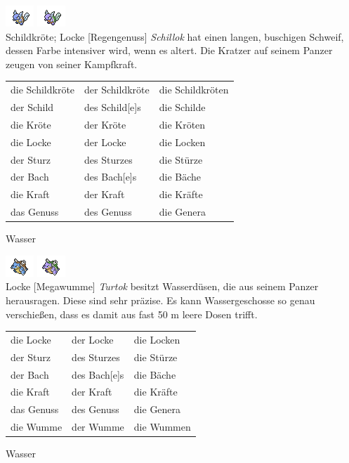 \documentclass[a7paper,10pt,%
,toc
,print
]{kartei}
\begin{document}
\begin{karte}[Sturzbach]{
\includegraphics{../regular/wartortle}
\includegraphics{../shiny/wartortle} \\
Schildkröte; Locke
}[Regengenuss]
\emph{Schillok} hat einen langen, buschigen Schweif, dessen Farbe intensiver 
wird, wenn es altert. Die Kratzer auf seinem Panzer zeugen von seiner 
Kampfkraft.

\vspace{5pt}
\begin{tabular}{lll}
die Schildkröte	&	der Schildkröte	&	die Schildkröten \\
der Schild	&	des Schild[e]s	&	die Schilde \\
die Kröte	&	der Kröte	&	die Kröten \\
die Locke	&	der Locke	&	die Locken \\
der Sturz	&	des Sturzes	&	die Stürze \\
der Bach	&	des Bach[e]s	&	die Bäche \\
die Kraft	&	der Kraft	&	die Kräfte \\
das Genuss	&	des Genuss	&	die Genera \\
\end{tabular}
\vspace{5pt}

Wasser
\end{karte}


\begin{karte}{
\includegraphics{../regular/blastoise}
\includegraphics{../shiny/blastoise} \\
Locke
}[Megawumme]
\emph{Turtok} besitzt Wasserdüsen, die aus seinem Panzer herausragen. Diese sind
sehr präzise. Es kann Wassergeschosse so genau verschießen, dass es damit aus
fast 50 m leere Dosen trifft.

\vspace{5pt}
\begin{tabular}{lll}
die Locke	&	der Locke	&	die Locken \\
der Sturz	&	des Sturzes	&	die Stürze \\
der Bach	&	des Bach[e]s	&	die Bäche \\
die Kraft	&	der Kraft	&	die Kräfte \\
das Genuss	&	des Genuss	&	die Genera \\
die Wumme	&	der Wumme	&	die Wummen \\
\end{tabular}
\vspace{5pt}

Wasser
\end{karte}
\end{document}
